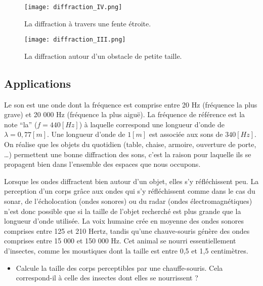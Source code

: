 \begin{figure}[ht]
    \begin{minipage}{.5\textwidth}
        \centering
        \texttt{[image: diffraction\_IV.png]}
        \caption{La diffraction à travers une fente étroite.}
        \label{fig:diffraction_IV}
    \end{minipage}
    \begin{minipage}{.5\textwidth}
        \centering
        \texttt{[image: diffraction\_III.png]}
        \caption{La diffraction autour d'un obstacle de petite taille.}
        \label{fig:diffraction_III}
    \end{minipage}
\end{figure}

\subsection{Applications}

\begin{tcolorbox}[title=Ondes acoustiques]
    Le son est une onde dont la fréquence est comprise entre 20 Hz (fréquence la plus grave) et 20 000 Hz (fréquence la plus aiguë). La fréquence de référence est la note \enquote{la} (\(f=440[Hz]\)) à laquelle correspond une longueur d'onde de \(\lambda=0,77[m]\). Une longueur d'onde de \(1 [m]\) est associée aux sons de \(340[Hz]\). On réalise que les objets du quotidien (table, chaise, armoire, ouverture de porte, \ldots) permettent une bonne diffraction des sons, c'est la raison pour laquelle ils se propagent bien dans l'ensemble des espaces que nous occupons.
\end{tcolorbox}

\begin{tcolorbox}[title=Écholocation]
    Lorsque les ondes diffractent bien autour d'un objet, elles s'y réfléchissent peu. La perception d'un corps grâce aux ondes qui s'y réfléchissent comme dans le cas du sonar, de l'écholocation (ondes sonores) ou du radar (ondes électromagnétiques) n'est donc possible que si la taille de l'objet recherché est plus grande que la longueur d'onde utilisée.
    La voix humaine crée en moyenne des ondes sonores comprises entre 125 et 210 Hertz, tandis qu'une chauve-souris génère des ondes comprises entre 15 000 et 150 000 Hz. Cet animal se nourri essentiellement d'insectes, comme les moustiques dont la taille est entre 0,5 et 1,5 centimètres.
    \begin{itemize}
        \item Calcule la taille des corps perceptibles par une chauffe-souris. Cela correspond-il à celle des insectes dont elles se nourrissent ?
    \end{itemize}
\end{tcolorbox}




